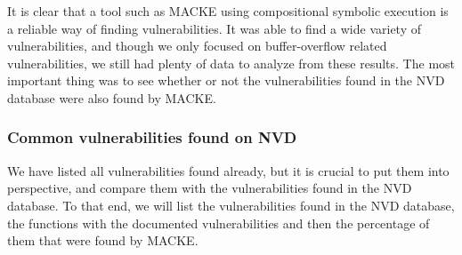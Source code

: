 It is clear that a tool such as MACKE using compositional symbolic execution is a reliable way of finding vulnerabilities. It was able to find a wide variety of vulnerabilities, and though we only focused on buffer-overflow related vulnerabilities, we still had plenty of data to analyze from these results. The most important thing was to see whether or not the vulnerabilities found in the NVD database were also found by MACKE.

\subsubsection{Common vulnerabilities found on NVD}

We have listed all vulnerabilities found already, but it is crucial to put them into perspective, and compare them with the vulnerabilities found in the NVD database. To that end, we will list the vulnerabilities found in the NVD database, the functions with the documented vulnerabilities and then the percentage of them that were found by MACKE.

